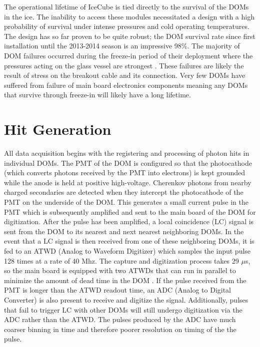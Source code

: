 \documentclass{gatech-thesis}
\begin{document}
The operational lifetime of IceCube is tied directly to the survival of the DOMs in the ice. The inability to access these modules necessitated a design with a high probability of survival under intense pressures and cold operating temperatures. The design has so far proven to be quite robust; the DOM survival rate since first installation until the 2013-2014 season is an impressive 98\%. The majority of DOM failures occurred during the freeze-in period of their deployment where the pressures acting on the glass vessel are strongest \cite{2009NIMPA.601..294A}. These failures are likely the result of stress on the breakout cable and its connection. Very few DOMs have suffered from failure of main board electronics components meaning any DOMs that survive through freeze-in will likely have a long lifetime.

\section{Hit Generation}

All data acquisition begins with the registering and processing of photon hits in individual DOMs. The PMT of the DOM is configured so that the photocathode (which converts photons received by the PMT into electrons) is kept grounded while the anode is held at positive high-voltage.  Cherenkov photons from nearby charged secondaries are detected when they intercept the photocathode of the PMT on the underside of the DOM. This generates a small current pulse in the PMT which is subsequently amplified and sent to the main board of the DOM for digitization. After the pulse has been amplified, a local coincidence (LC) signal is sent from the DOM to its nearest and next nearest neighboring DOMs. In the event that a LC signal is then received from one of these neighboring DOMs, it is fed to an ATWD (Analog to Waveform Digitizer) which samples the input pulse 128 times at a rate of 40 Mhz. The capture and digitization process takes 29 $\mu$s, so the main board is equipped with two ATWDs that can run in parallel to minimize the amount of dead time in the DOM \cite{2009NIMPA.601..294A}. If the pulse received from the PMT is longer than the ATWD readout time, an ADC (Analog to Digital Converter) is also present to receive and digitize the signal. Additionally, pulses that fail to trigger LC with other DOMs will still undergo digitization via the ADC rather than the ATWD. The pulses produced by the ADC have much coarser binning in time and therefore poorer resolution on timing of the the pulse.
\end{document}
